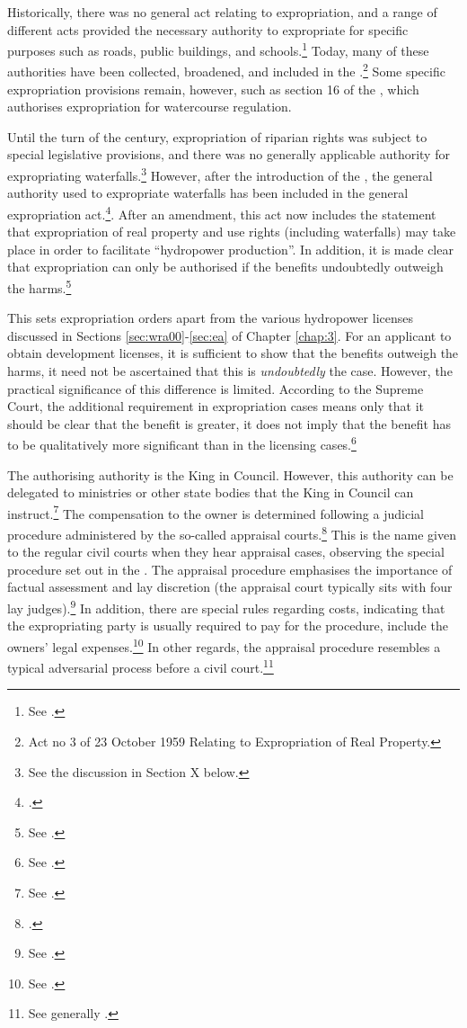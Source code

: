 Historically, there was no general act relating to expropriation, and a range of different acts provided the necessary authority to expropriate for specific purposes such as roads, public buildings, and schools.\footnote{See \cite[11-12]{nut54}.} Today, many of these authorities have been collected, broadened, and included in the \cite{ea59}.\footnote{Act no 3 of 23 October 1959 Relating to Expropriation of Real Property.} Some specific expropriation provisions remain, however, such as section 16 of the \cite{wra17}, which authorises expropriation for watercourse regulation.

Until the turn of the century, expropriation of riparian rights was subject to special legislative provisions, and there was no generally applicable authority for expropriating waterfalls.\footnote{See the discussion in Section X below.} However, after the introduction of the \cite{wra00}, the general authority used to expropriate waterfalls has been included in the general expropriation act.\footcite[2 no 51]{ea59}. After an amendment, this act now includes the statement that expropriation of real property and use rights (including waterfalls) may take place in order to facilitate ``hydropower production''. In addition, it is made clear that expropriation can only be authorised if the benefits undoubtedly outweigh the harms.\footnote{See \cite[2]{ea59}.} 

This sets expropriation orders apart from the various hydropower licenses discussed in Sections \ref{sec:wra00}-\ref{sec:ea} of Chapter \ref{chap:3}. For an applicant to obtain development licenses, it is sufficient to show that the benefits outweigh the harms, it need not be ascertained that this is {\it undoubtedly} the case. However, the practical significance of this difference is limited. According to the Supreme Court, the additional requirement in expropriation cases means only that it should be clear that the benefit is greater, it does not imply that the benefit has to be qualitatively more significant than in the licensing cases.\footnote{See \cite{lovenskiold09}.}

The authorising authority is the King in Council. However, this authority can be delegated to ministries or other state bodies that the King in Council can instruct.\footnote{See \cite[5]{ea59}.} The compensation to the owner is determined following a judicial procedure administered by the so-called appraisal courts.\footnote{\cite[2]{ea59}.} This is the name given to the regular civil courts when they hear appraisal cases, observing the special procedure set out in the \cite{aa17}. The appraisal procedure emphasises the importance of factual assessment and lay discretion (the appraisal court typically sits with four lay judges).\footnote{See \cite[11-12]{aa17}.} In addition, there are special rules regarding costs, indicating that the expropriating party is usually required to pay for the procedure, include the owners' legal expenses.\footnote{See \cite[54]{aa17}.} In other regards, the appraisal procedure resembles a typical adversarial process before a civil court.\footnote{See generally \cite{dyrkolbotn15}.} 

